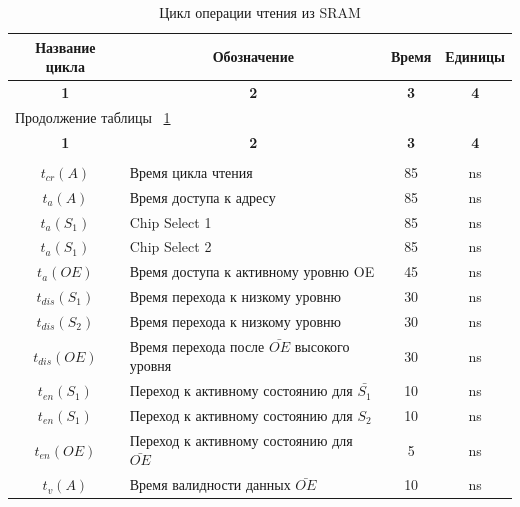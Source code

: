 \begin{center}
\begin{longtable}{|c|p{7cm}|c|c|}
\caption{Цикл операции чтения из SRAM} \label{tab:sram_read_cycle} \\ \hline
\multicolumn{1}{|p{3cm}|}{\textbf{Название цикла}}    &   \multicolumn{1}{c|}{\textbf{Обозначение}} & 
\multicolumn{1}{|c|}{\textbf{Время}}    &   \multicolumn{1}{c|}{\textbf{Единицы}} \\ \hline

\multicolumn{1}{|c|}{\textbf{1}}    &   \multicolumn{1}{|c|}{\textbf{2}} &
\multicolumn{1}{|c|}{\textbf{3}}    &   \multicolumn{1}{|c|}{\textbf{4}} \\ \hline
\endfirsthead

\multicolumn{4}{l}{{Продолжение таблицы ~\ref{tab:sram_read_cycle}}} \\ %
\hline
\multicolumn{1}{|c|}{\textbf{1}}    &   \multicolumn{1}{|c|}{\textbf{2}} &
\multicolumn{1}{|c|}{\textbf{3}}    &   \multicolumn{1}{|c|}{\textbf{4}} \\ \hline
\endhead
\endfoot

	\hline
		 &  &  &  \\
	\hline
		${t_{cr}(A)}$ & Время цикла чтения & 85 & ns \\
	\hline
		${t_a(A)}$ & Время доступа к адресу & 85 & ns \\
	\hline
		${t_a(S_1)}$ & Chip Select 1 & 85 & ns \\
	\hline
		${t_a(S_1)}$ & Chip Select 2 & 85 & ns \\
	\hline
		${t_a(OE)}$ & Время доступа к активному уровню OE & 45 & ns \\
	\hline
		${t_{dis}(S_1)}$ & Время перехода к низкому уровню & 30 & ns \\
	\hline
		${t_{dis}(S_2)}$ & Время перехода к низкому уровню & 30 & ns \\
	\hline
		${t_{dis}(OE)}$ & Время перехода после $\bar{OE}$ высокого уровня & 30 & ns \\
	\hline
		${t_{en}(S_1)}$ & Переход к активному состоянию для $\bar{S_1}$ & 10 & ns \\
	\hline
		${t_{en}(S_1)}$ & Переход к активному состоянию для ${S_2}$ & 10 & ns \\
	\hline
		${t_{en}(OE)}$ & Переход к активному состоянию для $\bar{OE}$ & 5 & ns \\
	\hline
		${t_{v}(A)}$ & Время валидности данных $\bar{OE}$ & 10 & ns \\
	\hline

\end{longtable}
\end{center}

